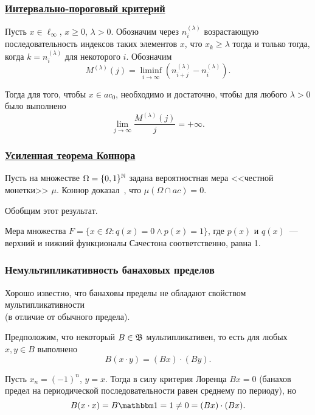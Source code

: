 \begin{frame}\frametitle{\underline{Интервально-пороговый критерий}}
	\begin{ttheorem}
		Пусть $x\in\ell_\infty$, $x \geq 0$, $\lambda>0$.
		Обозначим через $n^{(\lambda)}_i$ возрастающую последовательность
		индексов таких элементов $x$, что $x_k \geq \lambda$ тогда и только тогда,
		когда $k=n^{(\lambda)}_i$ для некоторого $i$.
		Обозначим
		\begin{equation}
			M^{(\lambda)}(j) = \liminf_{i\to\infty} \left(n^{(\lambda)}_{i+j} - n^{(\lambda)}_i\right)
			.
		\end{equation}


		Тогда для того, чтобы $x\in ac_0$, необходимо и достаточно, чтобы
		для любого $\lambda>0$ было выполнено
		\begin{equation}
			\lim_{j \to \infty} \frac{M^{(\lambda)}(j)}{j} = +\infty
			.
		\end{equation}
	\end{ttheorem}
\end{frame}


\begin{frame}\frametitle{\underline{Усиленная теорема Коннора}}
	Пусть на множестве $\Omega=\{0,1\}^{\mathbb{N}}$ задана вероятностная мера <<честной монетки>> $\mu$.
	Коннор доказал~\cite{connor1990almost}, что $\mu(\Omega\cap ac)=0$.

	Обобщим этот результат.

	\begin{ttheorem}
	Мера множества $F=\{x\in\Omega : q(x) = 0 \wedge p(x)= 1\}$,
	где $p(x)$ и $q(x)$~--- верхний и нижний функционалы Сачестона соответственно,
	равна 1.
	\end{ttheorem}
\end{frame}


\begin{frame}\frametitle{Немультипликативность банаховых пределов}
	Хорошо известно,
	что банаховы пределы не обладают свойством мультипликативности
	\\
	(в отличие от обычного предела).

	Предположим, что некоторый $B\in \mathfrak{B}$ мультипликативен,
	то есть для любых $x,y\in B$ выполнено
	\begin{equation}
		B(x\cdot y) = (Bx)\cdot (By)
		.
	\end{equation}

	Пусть $x_n = (-1)^n$, $y=x$.
	Тогда в силу критерия Лоренца $Bx = 0$
	(банахов предел на периодической последовательности равен среднему по периоду),
	но
	\begin{equation}
		B(x\cdot x) = B\one = 1 \ne 0 = (Bx) \cdot (Bx)
		.
	\end{equation}


\end{frame}


